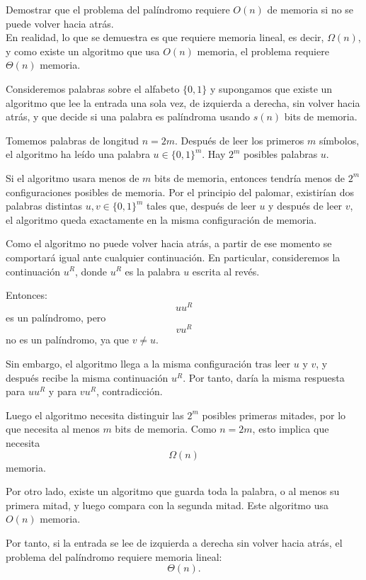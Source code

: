 \begin{ejercicio}
    Demostrar que el problema del palíndromo requiere $O(n)$ de memoria si no se puede volver hacia atrás. \\

    En realidad, lo que se demuestra es que requiere memoria lineal, es decir, $\Omega(n)$, y como existe un algoritmo que usa $O(n)$ memoria, el problema requiere $\Theta(n)$ memoria.

    Consideremos palabras sobre el alfabeto $\{0,1\}$ y supongamos que existe un algoritmo que lee la entrada una sola vez, de izquierda a derecha, sin volver hacia atrás, y que decide si una palabra es palíndroma usando $s(n)$ bits de memoria.

    Tomemos palabras de longitud $n=2m$. Después de leer los primeros $m$ símbolos, el algoritmo ha leído una palabra $u \in \{0,1\}^m$. Hay $2^m$ posibles palabras $u$.

    Si el algoritmo usara menos de $m$ bits de memoria, entonces tendría menos de $2^m$ configuraciones posibles de memoria. Por el principio del palomar, existirían dos palabras distintas $u,v \in \{0,1\}^m$ tales que, después de leer $u$ y después de leer $v$, el algoritmo queda exactamente en la misma configuración de memoria.

    Como el algoritmo no puede volver hacia atrás, a partir de ese momento se comportará igual ante cualquier continuación. En particular, consideremos la continuación $u^R$, donde $u^R$ es la palabra $u$ escrita al revés.

    Entonces:
    $$
    uu^R
    $$
    es un palíndromo, pero
    $$
    vu^R
    $$
    no es un palíndromo, ya que $v \neq u$.

    Sin embargo, el algoritmo llega a la misma configuración tras leer $u$ y $v$, y después recibe la misma continuación $u^R$. Por tanto, daría la misma respuesta para $uu^R$ y para $vu^R$, contradicción.

    Luego el algoritmo necesita distinguir las $2^m$ posibles primeras mitades, por lo que necesita al menos $m$ bits de memoria. Como $n=2m$, esto implica que necesita
    $$
    \Omega(n)
    $$
    memoria.

    Por otro lado, existe un algoritmo que guarda toda la palabra, o al menos su primera mitad, y luego compara con la segunda mitad. Este algoritmo usa $O(n)$ memoria.

    Por tanto, si la entrada se lee de izquierda a derecha sin volver hacia atrás, el problema del palíndromo requiere memoria lineal:
    $$
    \Theta(n).
    $$
\end{ejercicio}




